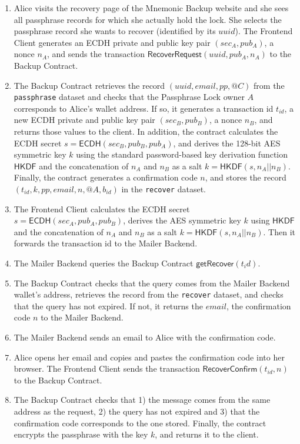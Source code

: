 \documentclass[runningheads]{llncs}
\newcommand{\ms}[1]{\ensuremath{\mathsf{#1}}}
\begin{document}
\begin{enumerate}
\item Alice visits the recovery page of the Mnemonic Backup website and she sees all passphrase records for which she actually hold the lock. She selects the passphrase record she wants to recover (identified by its $uuid$). The Frontend Client generates an ECDH private and public key pair $(sec_A, pub_A)$, a nonce $n_A$, and sends the transaction $\ms{RecoverRequest}(uuid, pub_A, n_A)$ to the Backup Contract.
\item The Backup Contract retrieves the record $(uuid, email, pp, @C)$ from the {\tt passphrase} dataset and checks that the Passphrase Lock owner $A$ corresponds to Alice's wallet address. If so, it generates a transaction id $t_{id}$, a new ECDH private and public key pair $(sec_B, pub_B)$, a nonce $n_B$, and returns those values to the client. In addition, the contract calculates the ECDH secret $s=\ms{ECDH}(sec_B, pub_B, pub_A)$, and derives the 128-bit AES symmetric key $k$ using the standard password-based key derivation function $\ms{HKDF}$ and the concatenation of $n_A$ and $n_B$ as a salt $k=\ms{HKDF}(s, n_A || n_B)$. Finally, the contract generates a confirmation code $n$, and stores the record $(t_{id}, k, pp, email, n, @A, b_{id})$ in the {\tt recover} dataset. 
\item The Frontend Client calculates the ECDH secret $s=\ms{ECDH}(sec_A, pub_A, pub_B)$, derives the AES symmetric key $k$ using $\ms{HKDF}$ and the concatenation of $n_A$ and $n_B$ as a salt $k=\ms{HKDF}(s, n_A || n_B)$. Then it forwards the transaction id to the Mailer Backend. 
\item The Mailer Backend queries the Backup Contract $\ms{getRecover}(t_id)$. 
\item The Backup Contract checks that the query comes from the Mailer Backend wallet's address, retrieves the record from the {\tt recover} dataset, and checks that the query has not expired. If not, it returns the $email$, the confirmation code $n$ to the Mailer Backend. 
\item The Mailer Backend sends an email to Alice with the confirmation code. 
\item Alice opens her email and copies and pastes the confirmation code into her browser. The Frontend Client sends the transaction $\ms{RecoverConfirm}(t_{id}, n)$ to the Backup Contract.
\item The Backup Contract checks that 1) the message comes from the same address as the request, 2) the query has not expired and 3) that the confirmation code corresponds to the one stored. Finally, the contract encrypts the passphrase with the key $k$, and returns it to the client. 
\end{enumerate}
\end{document}
